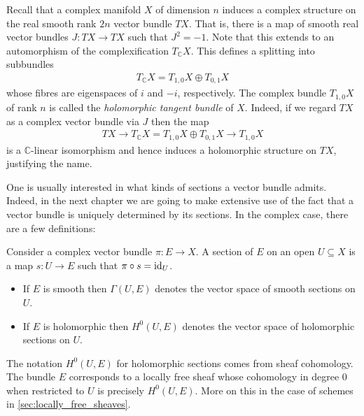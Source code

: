 \documentclass[12pt]{ociamthesis}  %
\begin{document}
\begin{example}
  Recall that a complex manifold $X$ of dimension $n$ induces a
  complex structure on the real smooth rank $2n$ vector bundle $TX$.
  That is, there is a map of smooth real vector bundles
  $J : TX \to TX$ such that $J^2 = -1$. Note that this extends to
  an automorphism of the complexification $T_{\mathbb{C}}X$.
  This defines a splitting into subbundles
  \begin{align}\label{eq:tangent_decomposition}
    T_{\mathbb{C}} X = T_{1,0}X \oplus T_{0,1}X
  \end{align}
  whose fibres are eigenspaces of $i$ and $-i$, respectively. The
  complex bundle $T_{1,0} X$ of rank $n$ is called the
  \emph{holomorphic tangent bundle} of $X$. Indeed, if we regard $TX$
  as a complex vector bundle via $J$ then the map
  \begin{align*}
    TX
    \longrightarrow T_{\mathbb{C}} X
    = T_{1,0}X \oplus T_{0,1}X
    \longrightarrow T_{1,0}X
  \end{align*}
  is a $\mathbb{C}$-linear isomorphism and hence induces a holomorphic
  structure on $TX$, justifying the name.
\end{example}

One is usually interested in what kinds of sections a vector bundle
admits. Indeed, in the next chapter we are going to make extensive use
of the fact that a vector bundle is uniquely determined by its sections.
In the complex case, there are a few definitions:

\begin{definition}
  Consider a complex vector bundle $\pi : E \to X$. A section of $E$
  on an open $U\subseteq X$ is a map $s : U \to E$ such that
  $\pi \circ s = \operatorname{id}_U$.
  \begin{itemize}
    \item If $E$ is smooth then $\Gamma(U,E)$ denotes the vector space
      of smooth sections on $U$.
    \item If $E$ is holomorphic then $H^0(U,E)$ denotes the vector space
      of holomorphic sections on $U$.
  \end{itemize}
\end{definition}

The notation $H^0(U,E)$ for holomorphic sections comes from sheaf
cohomology. The bundle $E$ corresponds to a locally free sheaf
whose cohomology in degree $0$ when restricted to $U$ is precisely
$H^0(U,E)$. More on this in the case of schemes in
\ref{sec:locally_free_sheaves}.
\end{document}
